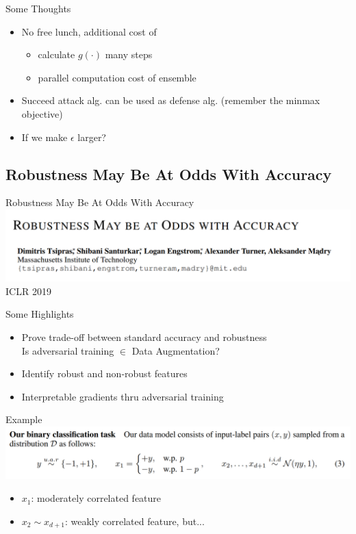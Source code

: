 \documentclass{beamer}
\begin{document}
\begin{frame}{Some Thoughts}
  \begin{itemize}
    \item No free lunch, additional cost of
      \begin{itemize}
        \item calculate $g(\cdot)$ many steps
        \item parallel computation cost of ensemble
      \end{itemize}
    \item Succeed attack alg. can be used as defense alg. (remember the minmax objective)
    \item If we make $\epsilon$ larger?
  \end{itemize}
\end{frame}

\subsection{Robustness May Be At Odds With Accuracy}
\begin{frame}{Robustness May Be At Odds With Accuracy}
  \includegraphics[width=\textwidth]{fig/p2/title.png}
  \center ICLR 2019
\end{frame}

\begin{frame}{Some Highlights}
  \begin{itemize}
    \item Prove trade-off between standard accuracy and robustness \\
      Is adversarial training $\in$ Data Augmentation?
    \item Identify robust and non-robust features
    \item Interpretable gradients thru adversarial training
  \end{itemize}
\end{frame}

\begin{frame}{Example}
  \includegraphics[width=\textwidth]{fig/p2/example.png}
  \begin{itemize}
    \item $x_1$: moderately correlated feature
    \item $x_2 \sim x_{d+1}$: weakly correlated feature, but...
  \end{itemize} 
\end{frame}
\end{document}
